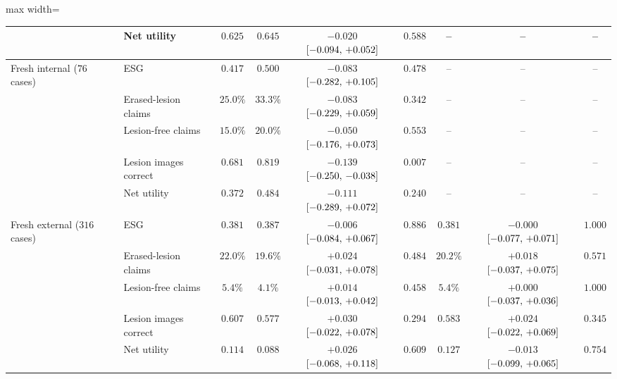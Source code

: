 \begin{table}[!htbp]
\begin{adjustbox}{max width=\linewidth}
\begin{tabular}{ll c c cc c cc}
 & Net utility & $0.625$ & $0.645$ & $-0.020$ $[-0.094,\,+0.052]$ & $0.588$ & -- & -- & -- \\
\midrule
Fresh internal ($76$ cases) & ESG & $0.417$ & $0.500$ & $-0.083$ $[-0.282,\,+0.105]$ & $0.478$ & -- & -- & -- \\
 & Erased-lesion claims & $25.0\%$ & $33.3\%$ & $-0.083$ $[-0.229,\,+0.059]$ & $0.342$ & -- & -- & -- \\
 & Lesion-free claims & $15.0\%$ & $20.0\%$ & $-0.050$ $[-0.176,\,+0.073]$ & $0.553$ & -- & -- & -- \\
 & Lesion images correct & $0.681$ & $0.819$ & $-0.139$ $[-0.250,\,-0.038]$ & $0.007$ & -- & -- & -- \\
 & Net utility & $0.372$ & $0.484$ & $-0.111$ $[-0.289,\,+0.072]$ & $0.240$ & -- & -- & -- \\
\midrule
Fresh external ($316$ cases) & ESG & $0.381$ & $0.387$ & $-0.006$ $[-0.084,\,+0.067]$ & $0.886$ & $0.381$ & $-0.000$ $[-0.077,\,+0.071]$ & $1.000$ \\
 & Erased-lesion claims & $22.0\%$ & $19.6\%$ & $+0.024$ $[-0.031,\,+0.078]$ & $0.484$ & $20.2\%$ & $+0.018$ $[-0.037,\,+0.075]$ & $0.571$ \\
 & Lesion-free claims & $5.4\%$ & $4.1\%$ & $+0.014$ $[-0.013,\,+0.042]$ & $0.458$ & $5.4\%$ & $+0.000$ $[-0.037,\,+0.036]$ & $1.000$ \\
 & Lesion images correct & $0.607$ & $0.577$ & $+0.030$ $[-0.022,\,+0.078]$ & $0.294$ & $0.583$ & $+0.024$ $[-0.022,\,+0.069]$ & $0.345$ \\
 & Net utility & $0.114$ & $0.088$ & $+0.026$ $[-0.068,\,+0.118]$ & $0.609$ & $0.127$ & $-0.013$ $[-0.099,\,+0.065]$ & $0.754$ \\
\bottomrule
\end{tabular}
\end{adjustbox}
\end{table}

